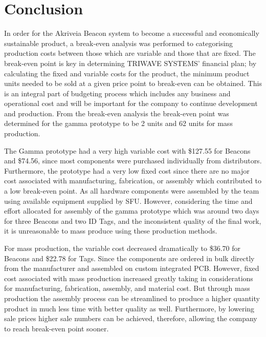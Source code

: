 

\setcounter{section}{2}
\section{Conclusion}

\bigskip
In order for the Akriveia Beacon system to become a successful and economically sustainable product, a break-even analysis was performed to categorising production costs between those which are variable and those that are fixed. The break-even point is key in determining TRIWAVE SYSTEMS’ financial plan; by calculating the fixed and variable costs for the product, the minimum product units needed to be sold at a given price point to break-even can be obtained. This is an integral part of budgeting process which includes any business and operational cost and will be important for the company to continue development and production. From the break-even analysis the break-even point was determined for the gamma prototype to be 2 units and 62 units for mass production. 

\bigskip
The Gamma prototype had a very high variable cost with \$127.55 for Beacons and \$74.56, since most components were purchased individually from distributors. Furthermore, the prototype had a very low fixed cost since there are no major cost associated with manufacturing, fabrication, or assembly which contributed to a low break-even point. As all hardware components were assembled by the team using available equipment supplied by SFU. However, considering the time and effort allocated for assembly of the gamma prototype which was around two days for three Beacons and two ID Tags, and the inconsistent quality of the final work, it is unreasonable to mass produce using these production methods.

\bigskip
For mass production, the variable cost decreased dramatically to \$36.70 for Beacons and \$22.78 for Tags. Since the components are ordered in bulk directly from the manufacturer and assembled on custom integrated PCB. However, fixed cost associated with mass production increased greatly taking in considerations for manufacturing, fabrication, assembly, and material cost. But through mass production the assembly process can be streamlined to produce a higher quantity product in much less time with better quality as well. Furthermore, by lowering sale prices higher sale numbers can be achieved, therefore, allowing the company to reach break-even point sooner.

